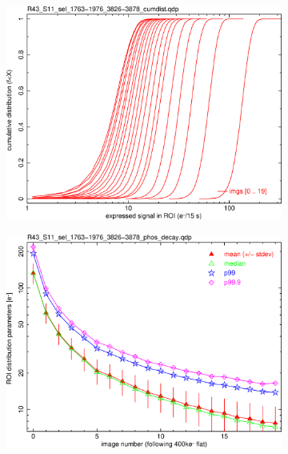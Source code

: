 \begin{figure}[!htbp]
\begin{subfigure}{0.45\textwidth}
  \centering
  \includegraphics[width=\textwidth]{figures/phosphorescence-survey/phos_kinetics/R43_S11_sel_1763-1976_3826-3878_cumdist.png}    
\end{subfigure}
\hfil
\begin{subfigure}{0.45\textwidth}
  \centering
  \includegraphics[width=\textwidth]{figures/phosphorescence-survey/phos_kinetics/R43_S11_sel_1763-1976_3826-3878_phos_decay.png}
\end{subfigure}
\newline
\begin{subfigure}{0.45\textwidth}    
  \centering

\end{subfigure}
\end{figure}
